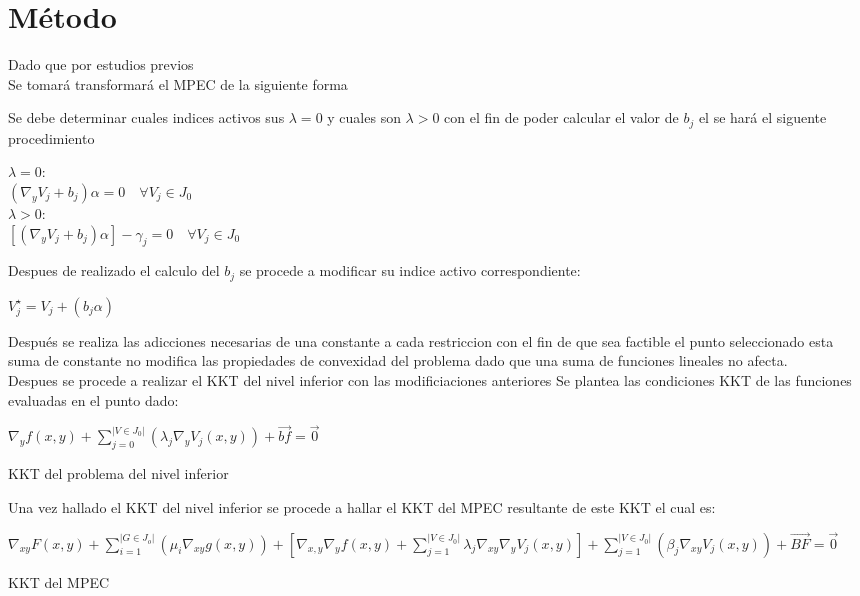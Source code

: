 \chapter{Método}

Dado que por estudios previos\\

Se tomará transformará el MPEC de la siguiente forma

Se debe determinar cuales indices activos sus $\lambda = 0$ y cuales son $\lambda>0$ con el fin de poder calcular el valor de $b_j$ el se hará el siguente procedimiento

\begin{table}[H]
	$\lambda =0$:\\
	$(\nabla_{y}V_j+b_j)\alpha=0 \quad \forall V_j \in J_0$ \\
	$\lambda>0$:\\
	$[(\nabla_{y}V_j+b_j)\alpha]-\gamma_j=0 \quad \forall V_j \in J_0$


\end{table}

Despues de realizado el calculo del $b_j$ se procede a modificar su indice activo correspondiente:

\begin{table}[H]
	$V_{j}^{\star}=V_{j}+(b_j\alpha)$
\end{table}

Después se realiza las adicciones necesarias de una constante a cada restriccion con el fin de que sea factible el punto seleccionado
esta suma de constante no modifica las propiedades de convexidad del problema dado que una suma de funciones lineales no afecta.\\


Despues se procede a realizar el KKT del nivel inferior con las modificiaciones anteriores 
Se plantea las condiciones KKT de las funciones evaluadas en el punto dado:
\begin{table}[H]
	$\nabla_{y}f(x,y)+\sum_{j=0}^{|V \in J_0|}(\lambda_j\nabla_{y}V_j(x,y))+\vec{bf}=\vec{0}$
\caption*{KKT del problema del nivel inferior}
\end{table}


Una vez hallado el KKT del nivel inferior se procede a hallar el KKT del MPEC resultante de este KKT el cual es:

\begin{table}[H]
	$\nabla_{xy}F(x,y)+\sum_{i=1}^{|G \in J_o|}(\mu_i\nabla_{xy}g(x,y))+[\nabla_{x,y}\nabla_{y}f(x,y)+\sum_{j=1}^{|V \in J_0|}\lambda_j\nabla_{xy}\nabla_{y}V_j(x,y)]+\sum_{j=1}^{|V \in J_0|}(\beta_j\nabla_{xy}V_j(x,y))+\vec{BF}=\vec{0}$
\caption*{KKT del MPEC}
\end{table}

